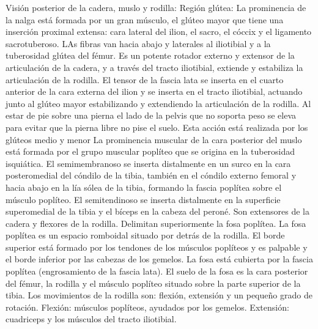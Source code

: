 \documentclass[a4paper,12pt]{article} %
\begin{document}
Visión posterior de la cadera, muslo y rodilla:
Región glútea: La prominencia de la nalga está formada por un gran músculo, el glúteo mayor que tiene una inserción proximal extensa: cara lateral del ilion, el sacro, el cóccix y el ligamento sacrotuberoso. LAs fibras  van hacia abajo y laterales al iliotibial y a la tuberosidad glútea del fémur. Es un potente rotador externo y extensor de la articulación de la cadera, y a través del tracto iliotibial, extiende y estabiliza la articulación de la rodilla. El tensor de la fascia lata se inserta en el cuarto anterior de la cara externa del ilion y se inserta en el tracto iliotibial, actuando junto al glúteo mayor estabilizando y extendiendo la articulación de la rodilla.
Al estar de pie sobre una pierna el lado de la pelvis que no soporta peso se eleva para evitar que la pierna libre no pise el suelo. Esta acción está realizada por los glúteos medio y menor
La prominencia muscular de la cara posterior del muslo está formada por el grupo muscular poplíteo que se origina en la tuberosidad isquiática. El semimembranoso se inserta distalmente en un surco en la cara posteromedial del cóndilo de la tibia, también en el cóndilo externo femoral y hacia abajo en la lía sólea de la tibia, formando la fascia poplítea sobre el músculo poplíteo. El semitendinoso se inserta distalmente en la superficie superomedial de la tibia y el bíceps en la cabeza del peroné. Son extensores de la cadera y flexores de la rodilla. Delimitan superiormente la fosa poplítea.
La fosa poplítea es un espacio romboidal situado por detrás de la rodilla. El borde superior está formado por los tendones de los músculos poplíteos y es palpable y el borde inferior por las cabezas de los gemelos. La fosa está cubierta por la fascia poplítea (engrosamiento de la fascia lata). El suelo de la fosa es la cara posterior del fémur, la rodilla y el músculo poplíteo situado sobre la parte superior de la tibia.
Los movimientos de la rodilla son: flexión, extensión y un pequeño grado de rotación. Flexión: músculos poplíteos, ayudados por los gemelos. Extensión: cuadriceps y los músculos del tracto iliotibial.
\end{document}
